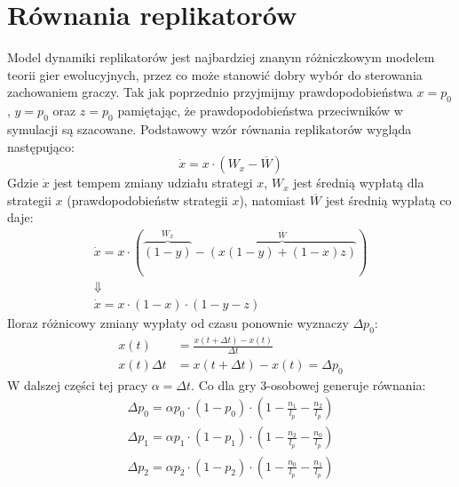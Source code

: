 
\section{Równania replikatorów}
\label{sec:r_repli}
Model dynamiki replikatorów jest najbardziej znanym różniczkowym modelem teorii gier ewolucyjnych, przez co może stanowić dobry wybór do sterowania zachowaniem graczy. Tak jak poprzednio przyjmijmy prawdopodobieństwa $x=p_0$, $y=p_0$ oraz $z=p_0$ pamiętając, że prawdopodobieństwa przeciwników w symulacji są szacowane. Podstawowy wzór równania replikatorów wygląda następująco:
\begin{equation}
\dot{x} = x \cdot ( W_x - \overline{W})
\end{equation}
Gdzie $\dot{x}$ jest tempem zmiany udziału strategi $x$, $W_x$ jest średnią wypłatą dla strategii $x$ (prawdopodobieństw strategii $x$), natomiast $\overline{W}$ jest średnią wypłatą co daje:
\begin{gather*}
\dot{x} = x \cdot ( \overbrace{(1-y)}^{W_x} - \overbrace{(x(1-y) + (1-x)z)}^{\overline{W}}) \\
\Downarrow \\
\dot{x} = x \cdot (1-x) \cdot (1-y-z)
\end{gather*}
Iloraz różnicowy zmiany wypłaty od czasu ponownie wyznaczy $\Delta p_0$:
\begin{align*}
x(t) &= \frac{x(t+\Delta t)-x(t)}{\Delta t} \\
x(t) \Delta t &= x(t+\Delta t)-x(t) = \Delta p_0
\end{align*} 
W dalszej części tej pracy $\alpha=\Delta t$. Co dla gry 3-osobowej generuje równania:
\begin{align} \label{eq:repli}
\Delta p_0 = \alpha p_0 \cdot (1 - p_0) \cdot (1 - \frac{n_1}{l_p} - \frac{n_2}{l_p}) \nonumber \\
\Delta p_1 = \alpha p_1 \cdot (1 - p_1) \cdot (1 - \frac{n_2}{l_p} - \frac{n_0}{l_p}) \\
\Delta p_2 = \alpha p_2 \cdot (1 - p_2) \cdot (1 - \frac{n_0}{l_p} - \frac{n_1}{l_p}) \nonumber
\end{align} 


